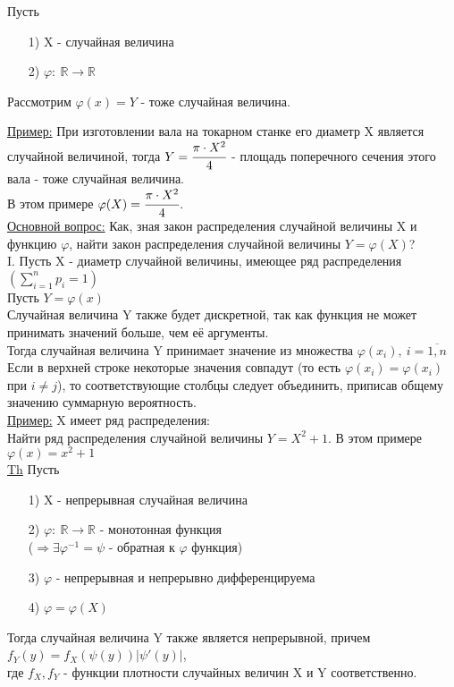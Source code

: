 
Пусть 
\begin{enumerate}
\item[1)] X - случайная величина
\item[2)] $\varphi: \ \mathbb{R} \to \mathbb{R}$ 
\end{enumerate}
Рассмотрим $\varphi(x) = Y$ - тоже случайная величина.


\underline{Пример:} При изготовлении вала на токарном станке его диаметр X является случайной величиной, тогда $Y = \cfrac{\pi \cdot X^2}{4}$ - площадь поперечного сечения этого вала - тоже случайная величина.\\
В этом примере $\varphi(X) = \cfrac{\pi \cdot X^2}{4}$. \\


\underline{Основной вопрос:} Как, зная закон распределения случайной величины X и функцию $\varphi$, найти закон распределения случайной величины $Y = \varphi(X)$? \\

I. Пусть X - диаметр случайной величины, имеющее ряд распределения \\
$\left( \sum\limits_{i = 1}^{n} p_i = 1 \right)$ \\
Пусть $Y = \varphi(x)$ \\
Случайная величина Y также будет дискретной, так как функция не может принимать значений больше, чем её аргументы. \\
Тогда случайная величина Y принимает значение из множества $\varphi(x_i), \ i = \overline{1,n}$ \\
Если в верхней строке некоторые значения совпадут (то есть $\varphi(x_i) = \varphi(x_i)$ при $i \neq j$), то соответствующие столбцы следует объединить, приписав общему значению суммарную вероятность. \\


\underline{Пример:} X имеет ряд распределения: \\
% 
Найти ряд распределения случайной величины $Y = X^2 + 1$. В этом примере $\varphi(x) = x^2 + 1$ \\


\underline{Th} Пусть
\begin{enumerate}
\item[1)] X - непрерывная случайная величина
\item[2)] $\varphi: \ \mathbb{R} \to \mathbb{R}$ - монотонная функция \\
($\Rightarrow \exists \varphi^{-1} = \psi$ - обратная к $\varphi$ функция) 
\item[3)] $\varphi$ - непрерывная и непрерывно дифференцируема 
\item[4)] $\varphi = \varphi(X)$
\end{enumerate}
Тогда случайная величина Y также является непрерывной, причем \\
$f_Y(y) = f_X \left(\psi(y)\right) \left|\psi'(y)\right|$, \\
где $f_X, f_Y$ - функции плотности случайных величин X и Y соответственно. \\


